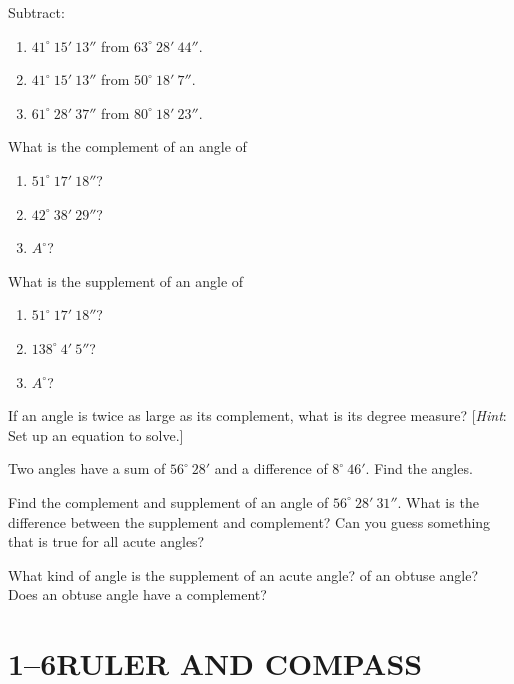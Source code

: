 \documentclass[11pt]{book}
\theoremstyle{bkplain}
\theoremstyle{XIplainnote}
\theoremstyle{bkplain}
\theoremstyle{bkplain}
\begin{document}
\begin{exercisecols}
\begin{exlist}
\begin{enumerate}[label=(\alph*), leftmargin=1.9em, itemsep=1pt, topsep=2pt]
  \end{enumerate}
\item Subtract:
  \begin{enumerate}[label=(\alph*), leftmargin=1.9em, itemsep=1pt, topsep=2pt]
  \item $41^\circ\ 15'\ 13''$ from $63^\circ\ 28'\ 44''$.
  \item $41^\circ\ 15'\ 13''$ from $50^\circ\ 18'\ 7''$.
  \item $61^\circ\ 28'\ 37''$ from $80^\circ\ 18'\ 23''$.
  \end{enumerate}
\item What is the complement of an angle of
  \begin{enumerate}[label=(\alph*), leftmargin=1.9em, itemsep=1pt, topsep=2pt]
  \item $51^\circ\ 17'\ 18''$?
  \item $42^\circ\ 38'\ 29''$?
  \item $A^\circ$?
  \end{enumerate}
\item What is the supplement of an angle of
  \begin{enumerate}[label=(\alph*), leftmargin=1.9em, itemsep=1pt, topsep=2pt]
  \item $51^\circ\ 17'\ 18''$?
  \item $138^\circ\ 4'\ 5''$?
  \item $A^\circ$?
  \end{enumerate}
\item If an angle is twice as large as its complement, what is its degree
      measure? [\emph{Hint}: Set up an equation to solve.]
\item Two angles have a sum of $56^\circ\ 28'$ and a difference of
      $8^\circ\ 46'$. Find the angles.
\item Find the complement and supplement of an angle of $56^\circ\ 28'\ 31''$.
      What is the difference between the supplement and complement? Can you guess
      something that is true for all acute angles?
\item What kind of angle is the supplement of an acute angle? of an obtuse angle?
      Does an obtuse angle have a complement?
\end{exlist}
\end{exercisecols}

\section*{1--6\quad RULER AND COMPASS}
\end{document}
